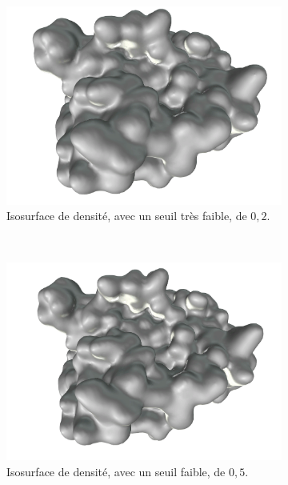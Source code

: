 \begin{figure}[H]
\begin{subfigure}[t]{\subImgW}
			\includegraphics[width=\textwidth]{./figures/ch1/4awn_iso_0_2}
			\caption{Isosurface de densité, avec un seuil très faible, de $0,2$.}
			\label{fig:4awn_iso_0_2}
		\end{subfigure}
		~
		\begin{subfigure}[t]{\subImgW}
			\centering
			\includegraphics[width=\textwidth]{./figures/ch1/4awn_iso_0_5}
			\caption{Isosurface de densité, avec un seuil faible, de $0,5$.}
			\label{fig:4awn_iso_0_5}
		\end{subfigure}
		~
		\begin{subfigure}[t]{\subImgW}
			\centering

\end{subfigure}
\end{figure}
